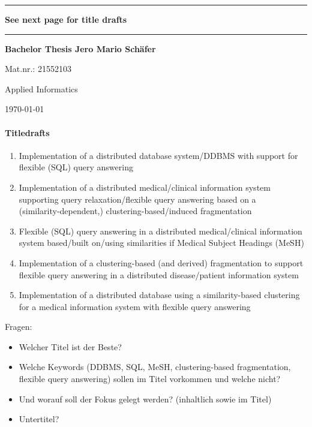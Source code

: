
\newpage
\thispagestyle{empty}
\newcommand{\Rule}{\rule{\textwidth}{1mm}}

\begin{center}

\Rule\vspace{5mm}
\sffamily\bfseries\Huge
See next page for title drafts
\vspace{1mm}\Rule
\vfill
\sffamily\bfseries\LARGE Bachelor Thesis
\vfill
\sffamily\bfseries\Large Jero Mario Schäfer\par Mat.nr.: 21552103\par Applied Informatics\par
\vfill

\raisebox{7mm}{Georg-August-University}
\raisebox{7mm}{Göttingen}\par
\vfill
\today
\end{center}


\newpage
\paragraph{Titledrafts}
\begin{enumerate}
    \item Implementation of a distributed database system/DDBMS with support for flexible (SQL) query answering
    \item Implementation of a distributed medical/clinical information system supporting query relaxation/flexible
            query answering based on a \\(similarity-dependent,) clustering-based/induced fragmentation
    \item Flexible (SQL) query answering in a distributed medical/clinical information system based/built on/using 
            similarities if Medical Subject Headings (MeSH)
    \item Implementation of a clustering-based (and derived) fragmentation to support flexible query answering in a
            distributed disease/patient information system
    \item Implementation of a distributed database using a similarity-based clustering for a medical information system
            with flexible query answering
\end{enumerate}

Fragen:
\begin{itemize}
    \item Welcher Titel ist der Beste?
    \item Welche Keywords (DDBMS, SQL, MeSH, clustering-based fragmentation, flexible query
            answering) sollen im Titel vorkommen und welche nicht?
    \item Und worauf soll der Fokus gelegt werden? (inhaltlich sowie im Titel)
    \item Untertitel?
\end{itemize}


